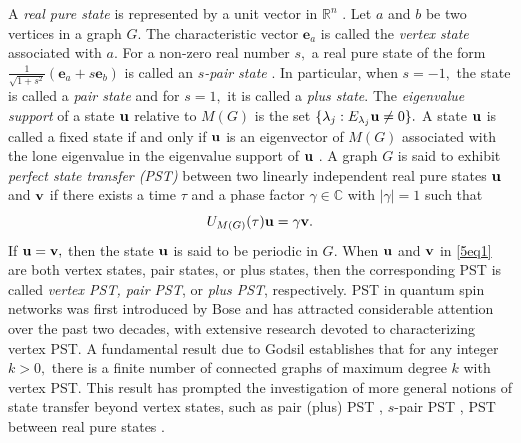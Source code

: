 \documentclass[12pt,a4paper]{article}
\def \e {{\bf e}}
\def \u {{\bf u}}
\def \v {{\bf v}}
\def \e {{\mathbf e}}
\newcommand{\ob}[1]{\left(#1\right)}
\begin{document}
A \textit{real pure state} is represented by a unit vector in $\mathbb{R}^n$ \cite{god7}. Let $a$ and $b$ be two vertices in a graph $G.$ The characteristic vector $\e_a$ is called the \textit{vertex state} associated with $a.$ For a non-zero real number $s,$ a real pure state of the form $\frac{1}{\sqrt{1+s^2}}\ob{\e_a+s\e_b}$ is called an \textit{$s$-pair state} \cite{kim}. In particular, when $s=-1,$ the state is called a \textit{pair state} and for $s=1,$ it is called a \textit{plus state}. 
The \textit{eigenvalue support} of a state $\u$ relative to $M(G)$ is the set 
$\{\lambda_j:E_{\lambda_j}\u\neq 0\}.$
A state $\u$ is called a fixed state if and only if $\u$ is an eigenvector of $M(G)$ associated with the lone eigenvalue in the eigenvalue support of $\u$ \cite{god7}.
A graph $G$ is said to exhibit \emph{perfect state transfer (PST)} between two linearly independent real pure states $\u$ and $\v$ if there exists a
time $\tau$ and a phase factor $\gamma\in\mathbb{C}$ with $|\gamma|=1$ such that
\begin{equation}\label{5eq1}
  U_{M(G)}(\tau)\u=\gamma\v.  
\end{equation} 
If $\u=\v,$ then the state 
$\u$ is said to be periodic in 
$G.$
When $\u$ and $\v$ in \eqref{5eq1} are both vertex states, pair states, or plus states, then the corresponding PST is called \textit{vertex PST, pair PST}, or \textit{plus PST}, respectively.  PST in quantum spin networks was first introduced by Bose \cite{bose} and has attracted considerable attention over the past two decades, with extensive research devoted to characterizing vertex PST.
A fundamental result due to Godsil \cite{god2} establishes that for any integer $k>0,$ there is a finite number of connected graphs of maximum degree $k$ with vertex PST. This result has prompted the investigation of more general notions of state transfer beyond vertex states, 
such as pair (plus) PST \cite{che1,  jia, ojha1, pal10}, $s$-pair PST \cite{kim}, PST between real pure states \cite{god8, god7,pal11}.  
\end{document}

